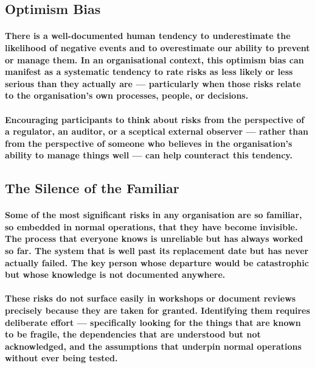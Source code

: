 \subsection{Optimism Bias}
\paragraph{There is a well-documented human tendency to underestimate the likelihood of negative events and to overestimate our ability to prevent or manage them. In an organisational context, this \textbf{optimism bias} can manifest as a systematic tendency to rate risks as less likely or less serious than they actually are — particularly when those risks relate to the organisation's own processes, people, or decisions.}
\paragraph{Encouraging participants to think about risks from the perspective of a regulator, an auditor, or a sceptical external observer — rather than from the perspective of someone who believes in the organisation's ability to manage things well — can help counteract this tendency.}

\subsection{The Silence of the Familiar}
\paragraph{Some of the most significant risks in any organisation are so familiar, so embedded in normal operations, that they have become invisible. The process that everyone knows is unreliable but has always worked so far. The system that is well past its replacement date but has never actually failed. The key person whose departure would be catastrophic but whose knowledge is not documented anywhere.}
\paragraph{These risks do not surface easily in workshops or document reviews precisely because they are taken for granted. Identifying them requires deliberate effort — specifically looking for the things that are known to be fragile, the dependencies that are understood but not acknowledged, and the assumptions that underpin normal operations without ever being tested.}


